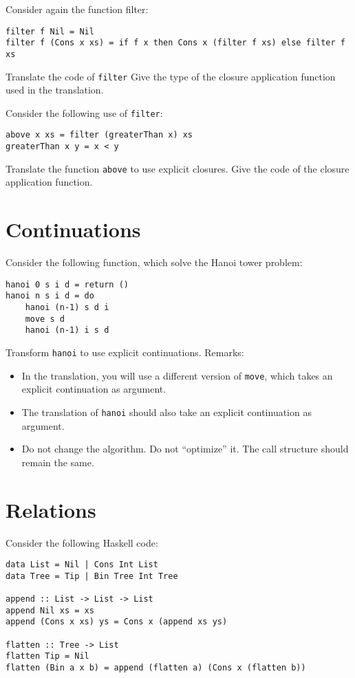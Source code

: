\documentclass{article}
\begin{document}
Consider again the function filter:
\begin{verbatim}
filter f Nil = Nil
filter f (Cons x xs) = if f x then Cons x (filter f xs) else filter f xs
\end{verbatim}

Translate the code of \texttt{filter} 
Give the type of the closure application function used in the translation. 

Consider the following use of \texttt{filter}:
\begin{verbatim}
above x xs = filter (greaterThan x) xs
greaterThan x y = x < y
\end{verbatim}

Translate the function \texttt{above} to use explicit closures. 
Give the code of the closure application function. 

\newpage
\section{Continuations}

Consider the following function, which solve the Hanoi tower problem:
\begin{verbatim}
hanoi 0 s i d = return ()
hanoi n s i d = do
    hanoi (n-1) s d i
    move s d 
    hanoi (n-1) i s d 
\end{verbatim}

Transform \texttt{hanoi} to use explicit continuations. Remarks: 
\begin{itemize}
\item In the translation, you will use a different version of
  \texttt{move}, which takes an explicit continuation as argument.
\item The translation of \texttt{hanoi} should also take an explicit
  continuation as argument.
\item Do not change the algorithm. Do not ``optimize'' it. The call
  structure should remain the same.
\end{itemize}

\newpage
\section{Relations}

Consider the following Haskell code:

\begin{verbatim}
data List = Nil | Cons Int List
data Tree = Tip | Bin Tree Int Tree

append :: List -> List -> List
append Nil xs = xs
append (Cons x xs) ys = Cons x (append xs ys)

flatten :: Tree -> List
flatten Tip = Nil
flatten (Bin a x b) = append (flatten a) (Cons x (flatten b))
\end{verbatim}
\end{document}
